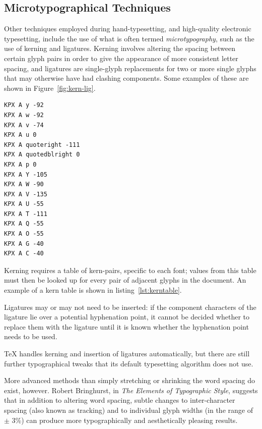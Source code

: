 \subsection{Microtypographical Techniques}
\label{sec:microtypography}
Other techniques employed during hand-type\-set\-t\-ing, and high-qua\-l\-ity electronic typesetting, include the use of what is often termed \emph{micro\-typo\-graphy},\hspace{0pt}\cite{Hurst2009} such as the use of kerning and ligatures. Kerning involves altering the spacing between certain glyph pairs in order to give the appearance of more consistent letter spacing, and ligatures are sin\-gle-glyph replacements for two or more single glyphs that may otherwise have had clashing components. Some examples of these are shown in Figure~\ref{fig:kern-lig}.

\begin{lstlisting}[label=lst:kerntable,captionpos=b,float,basicstyle=\ttfamily\footnotesize,caption={[Excerpt from a kern table]An excerpt from a kern table for Times Roman, showing kern pairs beginning with \texttt{A} only. This is taken from an AFM (Adobe Font Metrics) file, where the units are (according to the specification\cite{ASI1998}) \emph{equal to 1/1000 of the scale factor (point size) of the font being used}.}]
KPX A y -92
KPX A w -92
KPX A v -74
KPX A u 0
KPX A quoteright -111
KPX A quotedblright 0
KPX A p 0
KPX A Y -105
KPX A W -90
KPX A V -135
KPX A U -55
KPX A T -111
KPX A Q -55
KPX A O -55
KPX A G -40
KPX A C -40
\end{lstlisting}

Kerning requires a table of kern-pairs, specific to each font; values from this table must then be looked up for every pair of adjacent glyphs in the document. An example of a kern table is shown in listing~\ref{lst:kerntable}.

Ligatures may or may not need to be inserted: if the component characters of the ligature lie over a potential hyphenation point, it cannot be decided whether to replace them with the ligature until it is known whether the hyphenation point needs to be used.

\TeX{} handles kerning and insertion of ligatures automatically, but there are still further typographical tweaks that its default typesetting algorithm does not use.

More advanced methods than simply stretching or shrinking the word spacing do exist, however. Robert Bringhurst, in \emph{The Elements of Typographic Style},\hspace{0pt}\cite{Bringhurst2008} suggests that in addition to altering word spacing, subtle changes to inter-character spacing (also known as \gls{tracking}) and to individual glyph widths (in the range of $\pm$ 3\%) can produce more typographically and aesthetically pleasing results.




